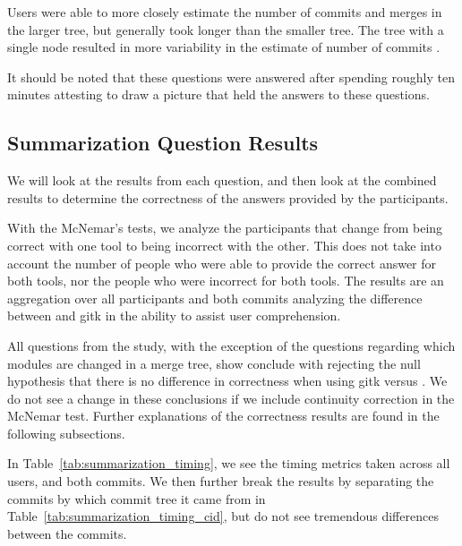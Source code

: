 Users were able to more closely estimate the number of commits and
merges in the larger tree, but generally took longer than the smaller
tree. The tree with a single node resulted in more variability in the
estimate of number of commits .

It should be noted that these questions were answered after spending
roughly ten minutes attesting to draw a picture that held the answers to
these questions.

\subsection{Summarization Question Results}

We will look at the results from each question, and then look at the
combined results to determine the correctness of the answers provided by
the participants.

With the McNemar's tests, we analyze the participants that change from
being correct with one tool to being incorrect with the other. This does
not take into account the number of people who were able to provide the
correct answer for both tools, nor the people who were incorrect for both
tools. The results are an aggregation over all participants and both
commits analyzing the difference between \tool and gitk in the ability
to assist user comprehension.

All questions from the study, with the exception of the questions
regarding which modules are changed in a merge tree, show conclude with
rejecting the null hypothesis that there is no difference in correctness
when using gitk versus \tool. We do not see a change in these
conclusions if we include continuity correction in the McNemar test.
Further explanations of the correctness results are found in the
following subsections.

In Table~\ref{tab:summarization_timing}, we see the timing metrics taken
across all users, and both commits. We then further break the results by
separating the commits by which commit tree it came from in
Table~\ref{tab:summarization_timing_cid}, but do not see tremendous
differences between the commits.

